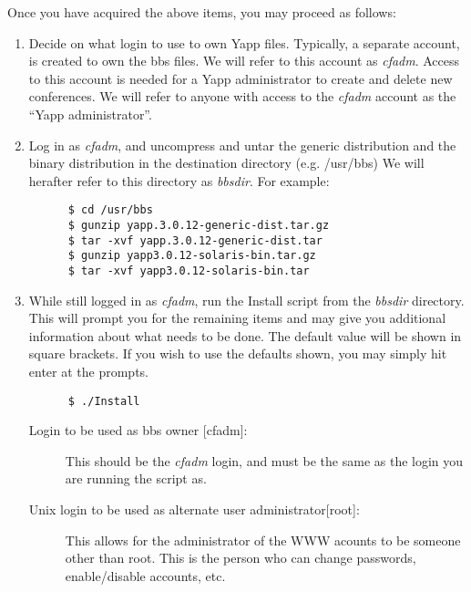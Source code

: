 \documentclass[twoside]{report}
\begin{document}
   Once you have acquired the above items, you may proceed as follows:
   \begin{enumerate}
   \item
      Decide on what login to use to own Yapp files.  Typically, a separate 
      account, is created to own the bbs files.  We will refer to this
      account as {\em cfadm}.  Access to this account is needed 
      for a Yapp administrator to create and delete new conferences.  We
      will refer to anyone with access to the {\em cfadm} account as the
      ``Yapp administrator''.

   \item Log in as {\em cfadm}, and uncompress and untar the generic 
      distribution and the binary distribution in the destination directory 
      (e.g. /usr/bbs)  We will herafter refer to this directory as
      {\em bbsdir}.  For example:
      \begin{verbatim}
      $ cd /usr/bbs 
      $ gunzip yapp.3.0.12-generic-dist.tar.gz 
      $ tar -xvf yapp.3.0.12-generic-dist.tar
      $ gunzip yapp3.0.12-solaris-bin.tar.gz
      $ tar -xvf yapp3.0.12-solaris-bin.tar
      \end{verbatim}
      \vspace{-12pt}

   \item While still logged in as {\em cfadm}, run the 
      Install script from the {\em bbsdir} directory.
      This will prompt you for the remaining items and may give you
      additional information about what needs to be done.  The default
      value will be shown in square brackets.  If you wish to use the
      defaults shown, you may simply hit enter at the prompts.
      \begin{verbatim}
      $ ./Install
      \end{verbatim}
      \vspace{-12pt}

      \begin{description}
      \item[{Login to be used as bbs owner [cfadm]:}] 
         \mbox{}\newline
         This should be the {\em cfadm} login, and must be the same as the 
         login you are running the script as.

      \item[{Unix login to be used as alternate user administrator[root]:}]
         \mbox{}\newline
          This allows for the administrator of the WWW acounts to be 
          someone other than root.  This is the person who can change
          passwords, enable/disable accounts, etc.


\end{description}
\end{enumerate}
\end{document}
